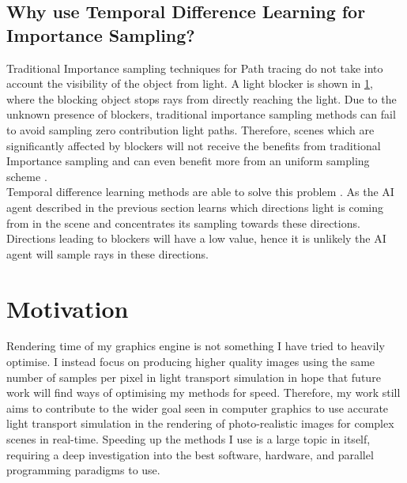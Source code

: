 \documentclass[ %
                    author={Callum Pearce},
                supervisor={Dr. Neill Campbell},
                    degree={MEng},
                     title={How effective are Temporal difference learning methods for reducing the number of zero contribution light paths while still accurately approximating Global Illumination in Path tracing?},
                  subtitle={},
                      type={research},
                      year={2019} ]{dissertation}
\begin{document}
\subsection{Why use Temporal Difference Learning for Importance Sampling?}

Traditional Importance sampling techniques for Path tracing do not take into account 
the visibility of the object from light. A light blocker is shown in \ref{}, where the 
blocking object stops rays from directly reaching the light. Due to the unknown 
presence of blockers, traditional importance sampling methods can fail to avoid 
sampling zero contribution light paths. Therefore, scenes which are significantly 
affected by blockers will not receive the benefits from traditional Importance sampling 
and can even benefit more from an uniform sampling scheme 
\cite{ramamoorthi2012theory}.\\


Temporal difference learning methods are able to solve this problem 
\cite{dahm2017learning}. As the AI agent described in the previous section learns 
which directions light is coming from in the scene and concentrates its sampling 
towards these directions. Directions leading to blockers will have a low value, 
hence it is unlikely the AI agent will sample rays in these directions.\\

\section{Motivation}

Rendering time of my graphics engine is not something I have tried to heavily optimise. I instead focus on producing higher quality images using the same number of samples per pixel in light transport simulation in hope that future work will find ways of optimising my methods for speed. Therefore, my work still aims to contribute to the wider goal seen in computer graphics to use accurate light transport simulation in the rendering of photo-realistic images for complex scenes in real-time.  Speeding up the methods I use is a large topic in itself, requiring a deep investigation into the best software, hardware, and parallel programming paradigms to use.\\
\end{document}
